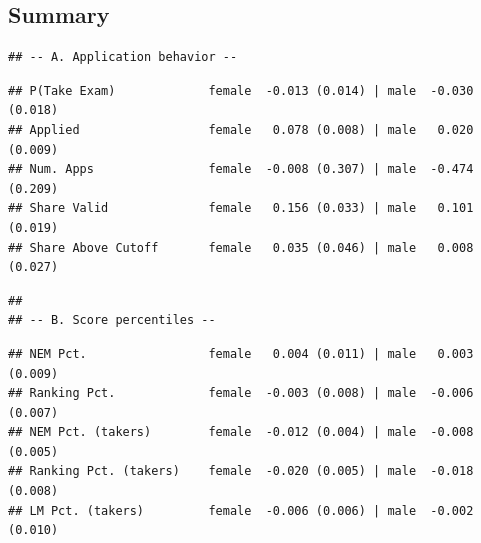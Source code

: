 \documentclass[
]{article}
\begin{document}
\begin{table}[htbp]
   \caption{Secondary-School Progression by Gender (Entrant Classes)}\label{tab: gender progression entrants}
   \centerline{}
\end{table}

\hypertarget{summary}{%
\subsection{Summary}\label{summary}}

\begin{verbatim}
## -- A. Application behavior --
\end{verbatim}

\begin{verbatim}
## P(Take Exam)             female  -0.013 (0.014) | male  -0.030 (0.018)
## Applied                  female   0.078 (0.008) | male   0.020 (0.009)
## Num. Apps                female  -0.008 (0.307) | male  -0.474 (0.209)
## Share Valid              female   0.156 (0.033) | male   0.101 (0.019)
## Share Above Cutoff       female   0.035 (0.046) | male   0.008 (0.027)
\end{verbatim}

\begin{verbatim}
## 
## -- B. Score percentiles --
\end{verbatim}

\begin{verbatim}
## NEM Pct.                 female   0.004 (0.011) | male   0.003 (0.009)
## Ranking Pct.             female  -0.003 (0.008) | male  -0.006 (0.007)
## NEM Pct. (takers)        female  -0.012 (0.004) | male  -0.008 (0.005)
## Ranking Pct. (takers)    female  -0.020 (0.005) | male  -0.018 (0.008)
## LM Pct. (takers)         female  -0.006 (0.006) | male  -0.002 (0.010)
\end{verbatim}
\end{document}
